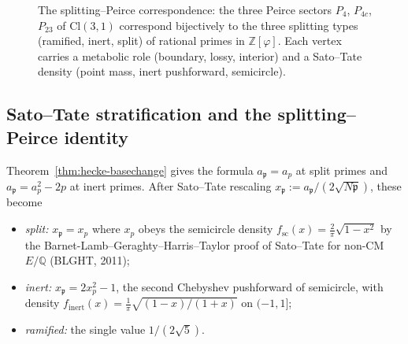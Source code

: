 \documentclass[11pt,a4paper]{article}
\theoremstyle{plain}
\theoremstyle{definition}
\theoremstyle{remark}
\numberwithin{equation}{section}
\providecommand{\Cl}{\mathrm{Cl}}
\providecommand{\Zp}{\ensuremath{\mathbb{Z}[\varphi]}}
\begin{document}
\begin{figure}[ht]
\centering
{}
\caption{The splitting--Peirce correspondence: the three Peirce sectors
$P_4$, $P_{4c}$, $P_{23}$ of $\Cl(3,1)$ correspond bijectively to the
three splitting types (ramified, inert, split) of rational primes in
$\Zp$.  Each vertex carries a metabolic role (boundary, lossy, interior)
and a Sato--Tate density (point mass, inert pushforward, semicircle).}
\label{fig:splitting-peirce}
\end{figure}

\subsection{Sato--Tate stratification and the splitting--Peirce identity}
\label{ssec:sato-tate-stratification}

Theorem~\ref{thm:hecke-basechange} gives the formula
$a_{\mathfrak p}=a_p$ at split primes and $a_{\mathfrak p}=a_p^2-2p$
at inert primes.  After Sato--Tate rescaling
$x_{\mathfrak p}:=a_{\mathfrak p}/(2\sqrt{N\mathfrak p})$, these become

\begin{itemize}\itemsep0pt
\item \emph{split:} $x_{\mathfrak p}=x_p$ where $x_p$ obeys the
semicircle density $f_{\mathrm{sc}}(x)=\tfrac{2}{\pi}\sqrt{1-x^2}$ by
the Barnet-Lamb--Geraghty--Harris--Taylor proof of Sato--Tate for
non-CM $E/\mathbb{Q}$ (BLGHT, 2011);
\item \emph{inert:} $x_{\mathfrak p}=2x_p^2-1$, the second Chebyshev
pushforward of semicircle, with density
$f_{\mathrm{inert}}(x)=\tfrac{1}{\pi}\sqrt{(1-x)/(1+x)}$ on $(-1,1]$;
\item \emph{ramified:} the single value $1/(2\sqrt 5)$.
\end{itemize}
\end{document}
